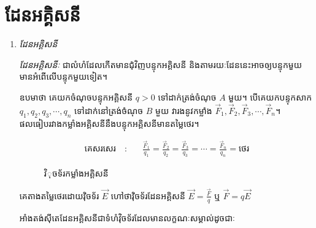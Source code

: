 \section{ដែនអគ្គិសនី}
\begin{enumerate}[k]
	\item \emph{\kml ដែនអគ្គិសនី}
	\begin{definition}
	\emph{\kml ដែនអគ្គិសនីៈ} ជាលំហំដែលកើតមានជុំវិញបន្ទុកអគ្គិសនី និងតាមរយៈដែននេះអាចឲ្យបន្ទុកមួយមានអំពើលើបន្ទុកមួយទៀត។
	\end{definition}
	ឧបមាថា​ គេយកចំណុចបន្ទុកអគ្គិសនី $q>0$ ទៅដាក់ត្រង់ចំណុច $A$ មួយ។ បើគេយកបន្ទុកសាក $q_{1},q_{2},q_{3},\cdots,q_{n}$ ទៅដាក់នៅត្រង់ចំណុច $B$ មួយ វារងនូវកម្លាំង $\overrightarrow{F}_{1}, \overrightarrow{F}_{2},\overrightarrow{F}_{3},\cdots, \overrightarrow{F}_{n}$។ \\
	ផលធៀបរវាងកម្លាំងអគ្គិសនីនឹងបន្ទុកអគ្គិសនីមានតម្លៃថេរ។
	\begin{multicols}{2}
	\begin{align*}
	\text{គេសរសេរ}\quad :&\quad \frac{\overrightarrow{F}_{1}}{q_{1}}=\frac{\overrightarrow{F}_{2}}{q_{2}}=\frac{\overrightarrow{F}_{3}}{q_{3}}=\cdots=\frac{\overrightarrow{F}_{n}}{q_{n}}=\text{ថេរ}
	\end{align*}
	\begin{figure}[H]
	\centering
	\caption{វិុចទ័រ​​កម្លាំងអគ្គិសនី}
	\end{figure}
	\end{multicols}
	គេតាងតម្លៃថេរដោយវុិចទ័រ $\overrightarrow{E}$ ហៅថាវុិចទ័រដែនអគ្គិសនី $\overrightarrow{E}=\frac{\overrightarrow{F}}{q}$ ឬ $\overrightarrow{F}=q\overrightarrow{E}$
	\begin{remark}
	អាំងតង់សុីតេដែនអគ្គិសនីជាទំហំវុិចទ័រដែលមានលក្ខណៈសម្គាល់ដូចជាៈ
	\begin{figure}[H]
	\centering
\end{figure}
\end{remark}
\end{enumerate}
